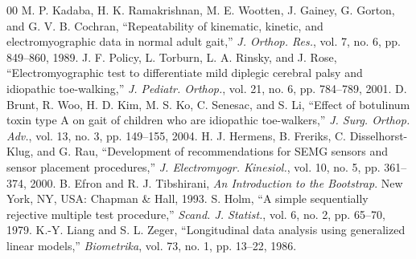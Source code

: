 \documentclass[conference]{IEEEtran}
\begin{document}
\begin{thebibliography}{00}
 M. P. Kadaba, H. K. Ramakrishnan, M. E. Wootten, J. Gainey, G. Gorton, and G. V. B. Cochran, ``Repeatability of kinematic, kinetic, and electromyographic data in normal adult gait,'' \emph{J. Orthop. Res.}, vol. 7, no. 6, pp. 849--860, 1989.
 J. F. Policy, L. Torburn, L. A. Rinsky, and J. Rose, ``Electromyographic test to differentiate mild diplegic cerebral palsy and idiopathic toe-walking,'' \emph{J. Pediatr. Orthop.}, vol. 21, no. 6, pp. 784--789, 2001.
 D. Brunt, R. Woo, H. D. Kim, M. S. Ko, C. Senesac, and S. Li, ``Effect of botulinum toxin type A on gait of children who are idiopathic toe-walkers,'' \emph{J. Surg. Orthop. Adv.}, vol. 13, no. 3, pp. 149--155, 2004.
 H. J. Hermens, B. Freriks, C. Disselhorst-Klug, and G. Rau, ``Development of recommendations for SEMG sensors and sensor placement procedures,'' \emph{J. Electromyogr. Kinesiol.}, vol. 10, no. 5, pp. 361--374, 2000.
 B. Efron and R. J. Tibshirani, \emph{An Introduction to the Bootstrap}. New York, NY, USA: Chapman \& Hall, 1993.
 S. Holm, ``A simple sequentially rejective multiple test procedure,'' \emph{Scand. J. Statist.}, vol. 6, no. 2, pp. 65--70, 1979.
 K.-Y. Liang and S. L. Zeger, ``Longitudinal data analysis using generalized linear models,'' \emph{Biometrika}, vol. 73, no. 1, pp. 13--22, 1986.
\end{thebibliography}
\end{document}
